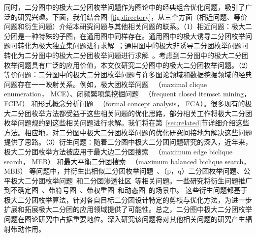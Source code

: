 同时，二分图中的极大二分团枚举问题作为图论中的经典组合优化问题，吸引了广泛的研究兴趣。下面，我们结合图~\ref{fig:directory}，从三个方面（相近问题、等价问题和衍生问题）介绍本研究问题与其他相关问题的联系。（1）相近问题：极大二分团是一种特殊的子图，在通用图中同样存在。通用图中的极大诱导二分团枚举问题可转化为极大独立集问题进行求解~\cite{MBE-induced21}；通用图中的极大非诱导二分团枚举问题可转化为二分图中的极大二分团枚举问题进行求解~\cite{Proof09}。考虑到二分图中的极大二分团枚举问题具有广泛的应用价值，本文仅研究二分图中的极大二分团枚举问题。（2）等价问题：二分图中的极大二分团枚举问题与许多图论领域和数据挖掘领域的经典问题存在一一映射关系。例如，极大团枚举问题~\cite{MCEchinese17,MCE20,MCEchinese20,MCE-GPU21,MCEchinese21,MCE22,MCEreview22} （maximal clique enumeration， MCE）、闭频繁项集挖掘问题~\cite{FCIM98,FCIM22} （frequent closed itemset mining， FCIM） 和形式概念分析问题~\cite{FCA21,FCA22} （formal concept analysis， FCA）。很多现有的极大二分团枚举方法都受益于这些相关问题的优化思路，部分相关工作将极大二分团枚举问题规约到这些相关问题进行求解。我们将在第~\ref{sec:related}节详细介绍这些方法。相应地，对二分图中极大二分团枚举问题的优化研究间接地为解决这些问题提供了思路。（3）衍生问题：随着二分图中极大二分团问题研究的深入，近年来，极大二分团枚举方法被应用于最大边二分团搜索~\cite{MEB20,MEB22} （maximum edge biclique search， MEB） 和最大平衡二分团搜索~\cite{MBB21} （maximum balanced biclique search， MBB） 等问题中，并衍生出相似二分团枚举问题~\cite{SimilarMBE22}、（p，q）二分团枚举问题\cite{Pqbiclique21,Pqbiclique23,Pq23,pqchinese22}、公平极大二分团枚举问题~\cite{FairMBE23}和二分团渗透社区~\cite{BicliqueCommunity23}等相关问题。一些研究将衍生问题推广到不确定图~\cite{MBEU23}、带符号图~\cite{Sun22,Sun23}、带权重图~\cite{WeightMEB22,WeightMBB22}和动态图~\cite{Ma22}的场景中。
这些衍生问题都基于极大二分团枚举算法，针对各自目标二分团设计特定的剪枝与优化方法，为进一步扩展和拓展极大二分团的应用领域提供了可能性。总之，二分图中极大二分团枚举问题在图论研究中占据重要地位。深入研究该问题将对其他相关问题的研究产生辐射带动作用。


